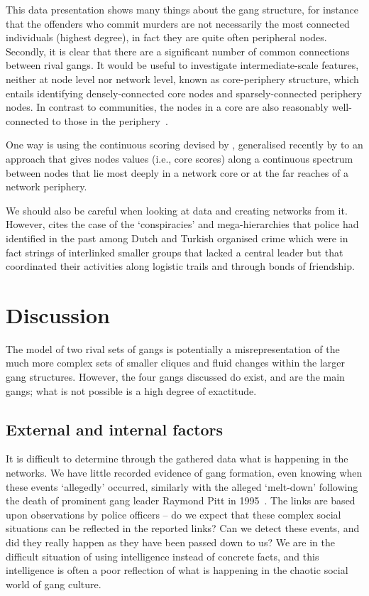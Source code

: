 \documentclass[twocolumn]{svjour3}          %
\theoremstyle{definition}
\begin{document}
This data presentation shows many things about the gang structure, for
instance that the offenders who commit murders are not necessarily the
most connected individuals (highest degree), in fact they are quite
often peripheral nodes. Secondly, it is clear that there are a
significant number of common connections between rival gangs. It would
be useful to investigate intermediate-scale features, neither at node
level nor network level, known as core-periphery structure, which
entails identifying densely-connected core nodes and
sparsely-connected periphery nodes. In contrast to communities, the
nodes in a core are also reasonably well-connected to those in the
periphery~\citep{rombach-et-al:2014}.

One way is using the continuous scoring devised by
\citet{borgatti+everett:2000}, generalised recently by
\citet{rombach-et-al:2014} to an approach that gives nodes values
(i.e., core scores) along a continuous spectrum between nodes that lie
most deeply in a network core or at the far reaches of a network
periphery.

We should also be careful when looking at data and creating networks
from it. However, \citet{Klerks2001} cites the case of the
`conspiracies' and mega-hierarchies that police had identified in the
past among Dutch and Turkish organised crime which were in fact
strings of interlinked smaller groups that lacked a central leader but
that coordinated their activities along logistic trails and through
bonds of friendship.

\section{Discussion}\label{sec:discussion}

The model of two rival sets of gangs is potentially a
misrepresentation of the much more complex sets of smaller cliques and
fluid changes within the larger gang structures. However, the four
gangs discussed do exist, and are the main gangs; what is not possible
is a high degree of exactitude.

\subsection{External and internal factors}

It is difficult to determine through the gathered data what is
happening in the networks. We have little recorded evidence of gang
formation, even knowing when these events `allegedly' occurred,
similarly with the alleged `melt-down' following the death of
prominent gang leader Raymond Pitt in 1995~\citep{Walsh2005}. The links
are based upon observations by police officers -- do we expect that
these complex social situations can be reflected in the reported
links? Can we detect these events, and did they really happen as they
have been passed down to us? We are in the difficult situation of
using intelligence instead of concrete facts, and this intelligence is
often a poor reflection of what is happening in the chaotic social
world of gang culture.
\end{document}
